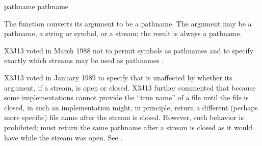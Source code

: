 \begin{defun}[Function]
pathname pathname

The  function converts its argument to be a pathname.
The argument may be a pathname, a string or symbol, or a stream;
the result is always a pathname.

\begin{new}
X3J13 voted in March 1988
not to permit symbols as pathnames
 and
to specify exactly which streams may be used as pathnames
.
\end{new}

\begin{new}
X3J13 voted in January 1989
to specify that  is unaffected
by whether its argument, if a stream, is open or closed.
X3J13 further commented that because some implementations cannot
provide the ``true name'' of a file until the file is closed,
in such an implementation  might, in principle,
return a different (perhaps more specific) file name after the stream is closed.
However, such behavior is prohibited;  must return the
same pathname after a stream is closed as it would have while the stream
was open.  See .
\end{new}
\end{defun}


